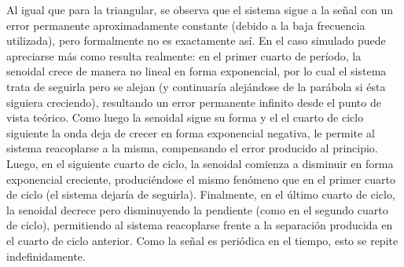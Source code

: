 \documentclass{article}
\begin{document}
Al igual que para la triangular, se observa que el sistema sigue a la señal con un error permanente aproximadamente constante (debido a la baja frecuencia utilizada), pero formalmente no es exactamente así. En el caso simulado puede apreciarse más como resulta realmente: en el primer cuarto de período, la senoidal crece de manera no lineal en forma exponencial, por lo cual el sistema trata de seguirla pero se alejan (y continuaría alejándose de la parábola si ésta siguiera creciendo), resultando un error permanente infinito desde el punto de vista teórico. Como luego la senoidal sigue su forma y el el cuarto de ciclo siguiente la onda deja de crecer en forma exponencial negativa, le permite al sistema reacoplarse a la misma, compensando el error producido al principio. Luego, en el siguiente cuarto de ciclo, la senoidal comienza a disminuir en forma exponencial creciente, produciéndose el mismo fenómeno que en el primer cuarto de ciclo (el sistema dejaría de seguirla). Finalmente, en el último cuarto de ciclo, la senoidal decrece pero disminuyendo la pendiente (como en el segundo cuarto de ciclo), permitiendo al sistema reacoplarse frente a la separación producida en el cuarto de ciclo anterior. Como la señal es periódica en el tiempo, esto se repite indefinidamente.
\end{document}
